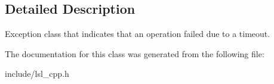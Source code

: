 \subsection{Detailed Description}
Exception class that indicates that an operation failed due to a timeout. 

The documentation for this class was generated from the following file\+:\begin{DoxyCompactItemize}
\item 
include/lsl\+\_\+cpp.\+h\end{DoxyCompactItemize}
